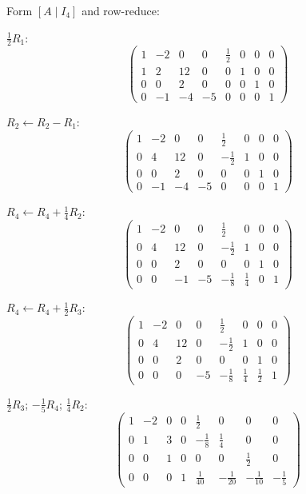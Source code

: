 \documentclass[12pt,a3paper]{article}
\begin{document}
\begin{tcolorbox}[enhanced,breakable,
  colback=cB!4,colframe=cB,boxrule=0.8pt,arc=5pt,
  title={\textbf{Answer --- Inverse of $A=\begin{pmatrix}2&-4&0&0\\1&2&12&0\\0&0&2&0\\0&-1&-4&-5\end{pmatrix}$}},
  fonttitle=\bfseries\color{white},colbacktitle=cB]

Form $[A\mid I_4]$ and row-reduce:

$\frac{1}{2}R_1$:
\[
\left(\begin{array}{cccc|cccc}
1&-2&0&0&\frac{1}{2}&0&0&0\\
1&2&12&0&0&1&0&0\\
0&0&2&0&0&0&1&0\\
0&-1&-4&-5&0&0&0&1
\end{array}\right)
\]

$R_2\leftarrow R_2-R_1$:
\[
\left(\begin{array}{cccc|cccc}
1&-2&0&0&\frac{1}{2}&0&0&0\\
0&4&12&0&-\frac{1}{2}&1&0&0\\
0&0&2&0&0&0&1&0\\
0&-1&-4&-5&0&0&0&1
\end{array}\right)
\]

$R_4\leftarrow R_4+\frac{1}{4}R_2$:
\[
\left(\begin{array}{cccc|cccc}
1&-2&0&0&\frac{1}{2}&0&0&0\\
0&4&12&0&-\frac{1}{2}&1&0&0\\
0&0&2&0&0&0&1&0\\
0&0&-1&-5&-\frac{1}{8}&\frac{1}{4}&0&1
\end{array}\right)
\]

$R_4\leftarrow R_4+\frac{1}{2}R_3$:
\[
\left(\begin{array}{cccc|cccc}
1&-2&0&0&\frac{1}{2}&0&0&0\\
0&4&12&0&-\frac{1}{2}&1&0&0\\
0&0&2&0&0&0&1&0\\
0&0&0&-5&-\frac{1}{8}&\frac{1}{4}&\frac{1}{2}&1
\end{array}\right)
\]

$\frac{1}{2}R_3$;\; $-\frac{1}{5}R_4$;\; $\frac{1}{4}R_2$:
\[
\left(\begin{array}{cccc|cccc}
1&-2&0&0&\frac{1}{2}&0&0&0\\
0&1&3&0&-\frac{1}{8}&\frac{1}{4}&0&0\\
0&0&1&0&0&0&\frac{1}{2}&0\\
0&0&0&1&\frac{1}{40}&-\frac{1}{20}&-\frac{1}{10}&-\frac{1}{5}
\end{array}\right)
\]


\end{tcolorbox}
\end{document}
